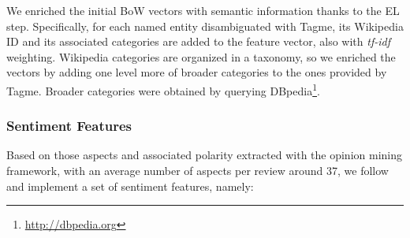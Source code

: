 We enriched the initial BoW vectors with semantic information thanks to the EL step. Specifically, for each named entity disambiguated with Tagme, its Wikipedia ID and its associated categories are added to the feature vector, also with \textit{tf-idf} weighting. Wikipedia categories are organized in a taxonomy, so we enriched the vectors by adding one level more of broader categories to the ones provided by Tagme. Broader categories were obtained by querying DBpedia\footnote{\url{http://dbpedia.org}}.


\subsubsection{Sentiment Features} 

Based on those aspects and associated polarity extracted with the opinion mining framework, with an average number of aspects per review around 37, we follow \cite{Suero2014} and implement a set of sentiment features, namely:

